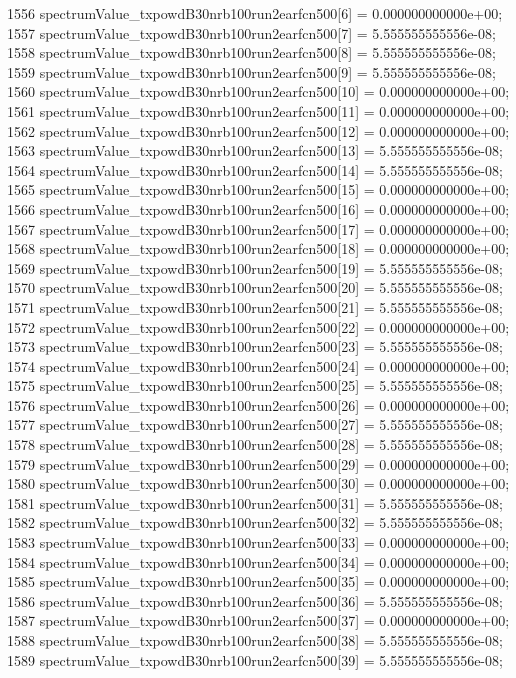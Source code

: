 \begin{DoxyCode}
1556   spectrumValue\_txpowdB30nrb100run2earfcn500[6] = 0.000000000000e+00;
1557   spectrumValue\_txpowdB30nrb100run2earfcn500[7] = 5.555555555556e-08;
1558   spectrumValue\_txpowdB30nrb100run2earfcn500[8] = 5.555555555556e-08;
1559   spectrumValue\_txpowdB30nrb100run2earfcn500[9] = 5.555555555556e-08;
1560   spectrumValue\_txpowdB30nrb100run2earfcn500[10] = 0.000000000000e+00;
1561   spectrumValue\_txpowdB30nrb100run2earfcn500[11] = 0.000000000000e+00;
1562   spectrumValue\_txpowdB30nrb100run2earfcn500[12] = 0.000000000000e+00;
1563   spectrumValue\_txpowdB30nrb100run2earfcn500[13] = 5.555555555556e-08;
1564   spectrumValue\_txpowdB30nrb100run2earfcn500[14] = 5.555555555556e-08;
1565   spectrumValue\_txpowdB30nrb100run2earfcn500[15] = 0.000000000000e+00;
1566   spectrumValue\_txpowdB30nrb100run2earfcn500[16] = 0.000000000000e+00;
1567   spectrumValue\_txpowdB30nrb100run2earfcn500[17] = 0.000000000000e+00;
1568   spectrumValue\_txpowdB30nrb100run2earfcn500[18] = 0.000000000000e+00;
1569   spectrumValue\_txpowdB30nrb100run2earfcn500[19] = 5.555555555556e-08;
1570   spectrumValue\_txpowdB30nrb100run2earfcn500[20] = 5.555555555556e-08;
1571   spectrumValue\_txpowdB30nrb100run2earfcn500[21] = 5.555555555556e-08;
1572   spectrumValue\_txpowdB30nrb100run2earfcn500[22] = 0.000000000000e+00;
1573   spectrumValue\_txpowdB30nrb100run2earfcn500[23] = 5.555555555556e-08;
1574   spectrumValue\_txpowdB30nrb100run2earfcn500[24] = 0.000000000000e+00;
1575   spectrumValue\_txpowdB30nrb100run2earfcn500[25] = 5.555555555556e-08;
1576   spectrumValue\_txpowdB30nrb100run2earfcn500[26] = 0.000000000000e+00;
1577   spectrumValue\_txpowdB30nrb100run2earfcn500[27] = 5.555555555556e-08;
1578   spectrumValue\_txpowdB30nrb100run2earfcn500[28] = 5.555555555556e-08;
1579   spectrumValue\_txpowdB30nrb100run2earfcn500[29] = 0.000000000000e+00;
1580   spectrumValue\_txpowdB30nrb100run2earfcn500[30] = 0.000000000000e+00;
1581   spectrumValue\_txpowdB30nrb100run2earfcn500[31] = 5.555555555556e-08;
1582   spectrumValue\_txpowdB30nrb100run2earfcn500[32] = 5.555555555556e-08;
1583   spectrumValue\_txpowdB30nrb100run2earfcn500[33] = 0.000000000000e+00;
1584   spectrumValue\_txpowdB30nrb100run2earfcn500[34] = 0.000000000000e+00;
1585   spectrumValue\_txpowdB30nrb100run2earfcn500[35] = 0.000000000000e+00;
1586   spectrumValue\_txpowdB30nrb100run2earfcn500[36] = 5.555555555556e-08;
1587   spectrumValue\_txpowdB30nrb100run2earfcn500[37] = 0.000000000000e+00;
1588   spectrumValue\_txpowdB30nrb100run2earfcn500[38] = 5.555555555556e-08;
1589   spectrumValue\_txpowdB30nrb100run2earfcn500[39] = 5.555555555556e-08;

\end{DoxyCode}
